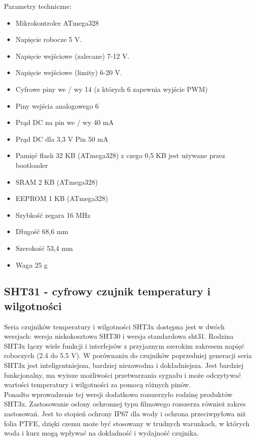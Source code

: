 \documentclass{classrep}
\begin{document}
Parametry techniczne:
\begin{itemize}
  \item Mikrokontroler ATmega328
  \item Napięcie robocze 5 V.
  \item Napięcie wejściowe (zalecane) 7-12 V.
  \item Napięcie wejściowe (limity) 6-20 V.
  \item Cyfrowe piny we / wy 14 (z których 6 zapewnia wyjście PWM)
  \item Piny wejścia analogowego 6
  \item Prąd DC na pin we / wy 40 mA
  \item Prąd DC dla 3,3 V Pin 50 mA
  \item Pamięć flash 32 KB (ATmega328) z czego 0,5 KB jest używane przez bootloader
  \item SRAM 2 KB (ATmega328)
  \item EEPROM 1 KB (ATmega328)
  \item Szybkość zegara 16 MHz
  \item Długość 68,6 mm
  \item Szerokość 53,4 mm
  \item Waga 25 g
\end{itemize}

\subsection {SHT31 - cyfrowy czujnik temperatury i wilgotności}
Seria czujników temperatury i wilgotności SHT3x dostępna jest w dwóch wersjach: wersja niskokosztowa SHT30 i wersja standardowa sht31. Rodzina SHT3x łączy wiele funkcji i interfejsów z przyjaznym szerokim zakresem napięć roboczych (2.4 do 5.5 V). W porównaniu do czujników poprzedniej generacji seria SHT3x jest inteligentniejsza, bardziej niezawodna i dokładniejsza. Jest bardziej funkcjonalny, ma wyższe możliwości przetwarzania sygnału i może odczytywać wartości temperatury i wilgotności za pomocą różnych pinów.\\

Ponadto wprowadzenie tej wersji dodatkowo rozszerzyło rodzinę produktów SHT3x. Zastosowanie osłony ochronnej typu filmowego rozszerza również zakres zastosowań. Jest to stopień ochrony IP67 dla wody i ochrona przeciwpyłowa niż folia PTFE, dzięki czemu może być stosowany w trudnych warunkach, w których woda i kurz mogą wpływać na dokładność i wydajność czujnika.\\
\end{document}
